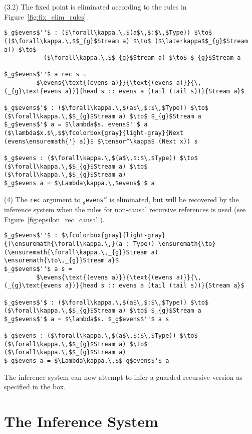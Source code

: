 (3.2) The fixed point is eliminated according to the rules in Figure~\ref{fig:fix_elim_rules}.
\begin{lstlisting}[mathescape, title=\ttBlock]
$_g$evens$''$ : ($\forall\kappa.\,$(a$\,$:$\,$Type)) $\to$ (($\forall\kappa.\,$$_{g}$Stream a) $\to$ ($\laterkappa$$_{g}$Stream a)) $\to$ 
           ($\forall\kappa.\,$$_{g}$Stream a) $\to$ $_{g}$Stream a

$_g$evens$''$ a rec s =
         $\evens{\text{(evens a)}}{\text{(evens a)}}{\,(_{g}\text{evens a})}{head s :: evens a (tail (tail s))}{Stream a}$

$_g$evens$'$ : ($\forall\kappa.\,$(a$\,$:$\,$Type)) $\to$ ($\forall\kappa.\,$$_{g}$Stream a) $\to$ $_{g}$Stream a
$_g$evens$'$ a = $\lambda$s. evens$''$ a ($\lambda$x.$\,$$\fcolorbox{gray}{light-gray}{Next (evens\ensuremath{'} a)}$ $\tensor^\kappa$ (Next x)) s

$_g$evens : ($\forall\kappa.\,$(a$\,$:$\,$Type)) $\to$ ($\forall\kappa.\,$$_{g}$Stream a) $\to$ ($\forall\kappa.\,$$_{g}$Stream a)
$_g$evens a = $\Lambda\kappa.\,$evens$'$ a
\end{lstlisting}
(4) The \texttt{rec} argument to \texttt{$_{g}$evens$''$} is eliminated, but will
be recovered by the inference system when the rules for non-causal recursive
references is used (see Figure~\ref{fig:epsilon_rec_causal}).
\begin{lstlisting}[mathescape, title=\ttBlock]
$_g$evens$''$ : $\fcolorbox{gray}{light-gray}{(\ensuremath{\forall\kappa.\,}(a : Type)) \ensuremath{\to} (\ensuremath{\forall\kappa.\,_{g}}Stream a) \ensuremath{\to\,_{g}}Stream a}$
$_g$evens$''$ a s =
         $\evens{\text{(evens a)}}{\text{(evens a)}}{\,(_{g}\text{evens a})}{head s :: evens a (tail (tail s))}{Stream a}$

$_g$evens$'$ : ($\forall\kappa.\,$(a$\,$:$\,$Type)) $\to$ ($\forall\kappa.\,$$_{g}$Stream a) $\to$ $_{g}$Stream a
$_g$evens$'$ a = $\lambda$s. $_g$evens$''$ a s

$_g$evens : ($\forall\kappa.\,$(a$\,$:$\,$Type)) $\to$ ($\forall\kappa.\,$$_{g}$Stream a) $\to$ ($\forall\kappa.\,$$_{g}$Stream a)
$_g$evens a = $\Lambda\kappa.\,$$_g$evens$'$ a
\end{lstlisting}
The inference system can now attempt to infer a guarded recursive version as
specified in the box.

\section{The Inference System}
\label{sec:inference-system}

